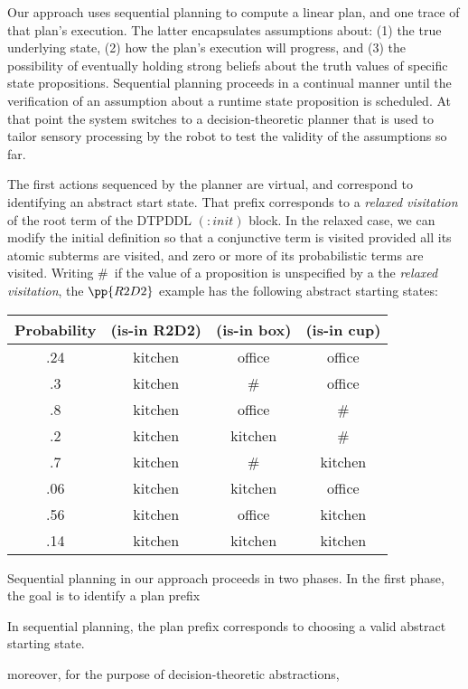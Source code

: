 \documentclass[letterpaper]{article}
\begin{document}
Our approach uses sequential planning to compute a linear plan, and
one trace of that plan's execution. The latter encapsulates
assumptions about: (1) the true underlying state, (2) how the plan's
execution will progress, and (3) the possibility of eventually holding
strong beliefs about the truth values of specific state
propositions. Sequential planning proceeds in a continual manner until
the verification of an assumption about a runtime state proposition is
scheduled. At that point the system switches to a decision-theoretic
planner that is used to tailor sensory processing by the robot to test
the validity of the assumptions so far.

The first actions sequenced by the planner are virtual, and correspond
to identifying an abstract start state. That prefix corresponds to a
{\em relaxed visitation} of the root term of the DTPDDL $(:init)$
block. In the relaxed case, we can modify the initial definition so
that a conjunctive term is visited provided all its atomic subterms
are visited, and zero or more of its probabilistic terms are
visited. Writing \#\ if the value of a proposition is unspecified by a
the {\em relaxed visitation}, the $\pp{R2D2}$ example has the
following abstract starting states:


\small
\begin{tabular}{cccc}
\hline
Probability & (is-in R2D2)  & (is-in box)  & (is-in cup) \\
\hline
.24 & kitchen & office & office \\
.3 & kitchen & \# & office \\
.8 & kitchen & office & \# \\
.2 & kitchen & kitchen & \# \\
.7 & kitchen & \# &  kitchen\\
.06 & kitchen & kitchen & office \\
.56 & kitchen & office & kitchen \\
.14 & kitchen & kitchen & kitchen \\
\hline
\end{tabular}
\normalsize





Sequential planning in our approach proceeds in two phases. In the
first phase, the goal is to identify a plan prefix

In sequential planning, the plan prefix corresponds to choosing a
valid abstract starting state. 

moreover, for the purpose of decision-theoretic abstractions, 
\end{document}
